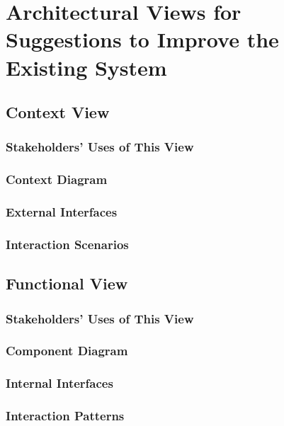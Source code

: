 \section{Architectural Views for Suggestions to Improve the Existing System}

\subsection{Context View}

\subsubsection{Stakeholders' Uses of This View}

\subsubsection{Context Diagram}

\subsubsection{External Interfaces}

\subsubsection{Interaction Scenarios}

\subsection{Functional View}

\subsubsection{Stakeholders' Uses of This View}

\subsubsection{Component Diagram}

\subsubsection{Internal Interfaces}

\subsubsection{Interaction Patterns}

